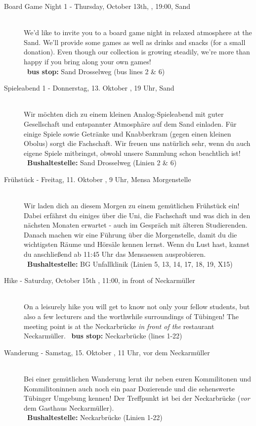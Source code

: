 \begin{description}
\ifml
	\item[Board Game Night 1 - Thursday, October 13th, \YEAR, 19:00, Sand]~\\
	We'd like to invite you to a board game night in relaxed atmosphere at the Sand.
    We'll provide some games as well as drinks and snacks (for a small donation).
    Even though our collection is growing steadily, we're more than happy if you bring along your own games!\\
	~\textbf{bus stop:} Sand Drosselweg (bus lines 2 \& 6)
\else
    \item[Spieleabend 1 - Donnerstag, 13. Oktober \YEAR, 19 Uhr, Sand]~\\
	Wir möchten dich zu einem kleinen Analog-Spieleabend mit guter Gesellschaft und entspannter Atmosphäre auf dem Sand einladen.
    Für einige Spiele sowie Getränke und Knabberkram (gegen einen kleinen Obolus) sorgt die Fachschaft.
    Wir freuen uns natürlich sehr, wenn du auch eigene Spiele mitbringst, obwohl unsere Sammlung schon beachtlich ist!\\
	~\textbf{Bushaltestelle:} Sand Drosselweg (Linien 2 \& 6)
\fi

\ifbachelor
	\item[Frühstück - Freitag, 11. Oktober \YEAR, 9 Uhr, Mensa Morgenstelle]\ \\
	Wir laden dich an diesem Morgen zu einem gemütlichen Frühstück ein! Dabei erfährst du einiges über die Uni, die Fachschaft und was dich in den nächsten Monaten erwartet - auch im Gespräch mit älteren Studierenden.
	Danach machen wir eine Führung über die Morgenstelle, damit du die wichtigsten Räume und Hörsäle kennen lernst.
	Wenn du Lust hast, kannst du anschließend ab 11:45 Uhr das Mensaessen ausprobieren.\\
	~\textbf{Bushaltestelle:} BG Unfallklinik (Linien 5, 13, 14, 17, 18, 19, X15)
\fi

\ifml
	\item[Hike - Saturday, October 15th \YEAR, 11:00, in front of Neckarmüller]~\\
	On a leisurely hike you will get to know not only your fellow students,
	but also a few lecturers and the worthwhile surroundings of Tübingen!
	The meeting point is at the Neckarbrücke \emph{in front of the} restaurant \glqq Neckarmüller\grqq.
	~\textbf{bus stop:} Neckarbrücke (lines 1-22)
\else
	\item[Wanderung - Samstag, 15. Oktober \YEAR, 11 Uhr, vor dem Neckarmüller]~\\
	Bei einer gemütlichen Wanderung lernt ihr neben euren Kommilitonen und Kommilitoninnen auch
	noch ein paar Dozierende und die sehenswerte Tübinger Umgebung kennen!
	Der Treffpunkt ist bei der Neckarbrücke (\emph{vor} dem Gasthaus \glqq Neckarmüller\grqq).\\
	~\textbf{Bushaltestelle:} Neckarbrücke (Linien 1-22) 
\fi


\end{description}

